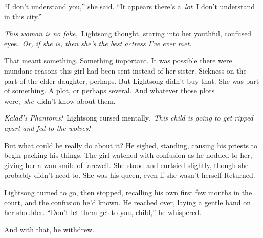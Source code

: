 “I don’t understand you,” she said. “It appears there’s a~\textit{lot}~I don’t understand in this city.”

\textit{This woman is no fake,}~Lightsong thought, staring into her youthful, confused eyes.~\textit{Or, if she is, then she’s the best actress I’ve ever met.}

That meant something. Something important. It was possible there were mundane reasons this girl had been sent instead of her sister. Sickness on the part of the elder daughter, perhaps. But Lightsong didn’t buy that. She was part of something. A plot, or perhaps several. And whatever those plots were,~\textit{she}~didn’t know about them.

\textit{Kalad’s Phantoms!}~Lightsong cursed mentally.~\textit{This child is going to get ripped apart and fed to the wolves!}

But what could he really do about it? He sighed, standing, causing his priests to begin packing his things. The girl watched with confusion as he nodded to her, giving her a wan smile of farewell. She stood and curtsied slightly, though she probably didn’t need to. She was his queen, even if she wasn’t herself Returned.

Lightsong turned to go, then stopped, recalling his own first few months in the court, and the confusion he’d known. He reached over, laying a gentle hand on her shoulder. “Don’t let them get to you, child,” he whispered.

And with that, he withdrew.

